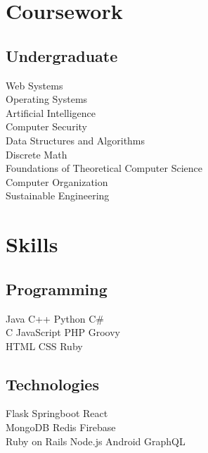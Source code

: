 \documentclass[letterpaper]{deedy-resume} %
\begin{document}
\begin{minipage}[t]{0.33\textwidth}
\section{Coursework}

\subsection{Undergraduate}

Web Systems \\
Operating Systems \\
Artificial Intelligence \\
Computer Security \\
Data Structures and Algorithms \\
Discrete Math \\
Foundations of Theoretical Computer Science \\
Computer Organization \\
Sustainable Engineering \\


\sectionspace %


\section{Skills}

\subsection{Programming}

Java \textbullet{} C++ \textbullet{} Python \textbullet{} C\# \\
C \textbullet{} JavaScript \textbullet{} PHP \textbullet{} Groovy \\
\textbullet{} HTML \textbullet{} CSS \textbullet{} Ruby \\
\sectionspace %

\subsection{Technologies}
Flask \textbullet{} Springboot \textbullet{} React \\
\textbullet{} MongoDB \textbullet{} Redis \textbullet{} Firebase \\
\textbullet{} Ruby on Rails \textbullet{} Node.js \textbullet{} Android
\textbullet{} GraphQL
\sectionspace %


\end{minipage}
\end{document}
